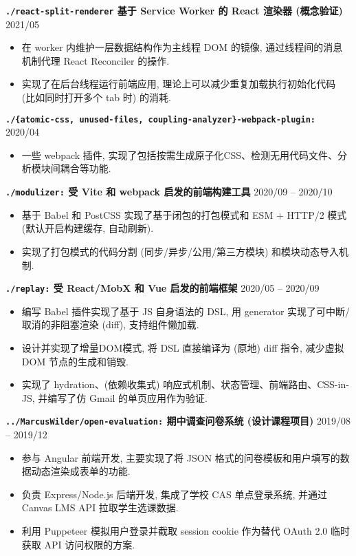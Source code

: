 \documentclass[10 pt]{article}
\begin{document}
\textbf{\texttt{./react-split-renderer}  基于 Service Worker 的 React 渲染器 (概念验证)} \hfill 2021/05 
\begin{itemize}
\item  在 worker 内维护一层数据结构作为主线程 DOM 的镜像, 通过线程间的消息机制代理 React Reconciler 的操作.
\item 实现了在后台线程运行前端应用, 理论上可以减少重复加载执行初始化代码 (比如同时打开多个 tab 时) 的消耗.
\end{itemize}

\textbf{\texttt{./\{atomic-css, unused-files, coupling-analyzer\}-webpack-plugin:} } \hfill 2020/04
\begin{itemize}
\item 一些 webpack 插件, 实现了包括按需生成原子化CSS、检测无用代码文件、分析模块间耦合等功能.
\end{itemize}

\textbf{\texttt{./modulizer:} 受 Vite 和 webpack 启发的前端构建工具} \hfill 2020/09 -- 2020/10
\begin{itemize}
\item 基于 Babel 和 PostCSS 实现了基于闭包的打包模式和 ESM + HTTP/2 模式 (默认开启构建缓存, 自动刷新).
\item 实现了打包模式的代码分割 (同步/异步/公用/第三方模块) 和模块动态导入机制.
\end{itemize}

\textbf{\texttt{./replay:} 受 React/MobX 和 Vue 启发的前端框架} \hfill 2020/05 -- 2020/09
\begin{itemize}
\item 编写 Babel 插件实现了基于 JS 自身语法的 DSL, 用 generator 实现了可中断/取消的非阻塞渲染 (diff), 支持组件懒加载.
\item 设计并实现了增量DOM模式, 将 DSL 直接编译为 (原地) diff 指令, 减少虚拟 DOM 节点的生成和销毁.
\item 实现了 hydration、(依赖收集式) 响应式机制、状态管理、前端路由、CSS-in-JS, 并编写了仿 Gmail 的单页应用作为验证.
\end{itemize}

\textbf{\texttt{../MarcusWilder/open-evaluation:} 期中调查问卷系统 (设计课程项目)} \hfill 2019/08 -- 2019/12
\begin{itemize}
\item 参与 Angular 前端开发, 主要实现了将 JSON 格式的问卷模板和用户填写的数据动态渲染成表单的功能.
\item 负责 Express/Node.js 后端开发, 集成了学校 CAS 单点登录系统, 并通过 Canvas LMS API 拉取学生选课数据.
\item 利用 Puppeteer 模拟用户登录并截取 session cookie 作为替代 OAuth 2.0 临时获取 API 访问权限的方案.
\end{itemize}
\end{document}
